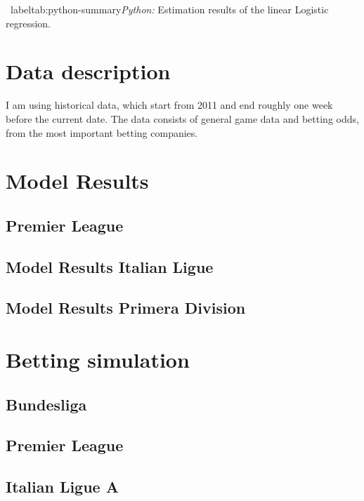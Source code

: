\documentclass[11pt, a4paper, leqno]{article}
\begin{document}
\begin{table}[!h]
    
    \caption{\ label{tab:python-summary}\emph{Python:} Estimation results of the
        linear Logistic regression.}
\end{table}

\section{Data description}
I am using historical data, which start from 2011 and end roughly one week before the current date. The data consists of general game data and betting odds, from the most important
betting companies.

\section{Model Results}
\subsection{Premier League}
\subsection{Model Results Italian Ligue }
\subsection{Model Results Primera Division}
\section{Betting simulation}
\subsection{Bundesliga}
\subsection{Premier League}
\subsection{Italian Ligue A}








\end{document}

